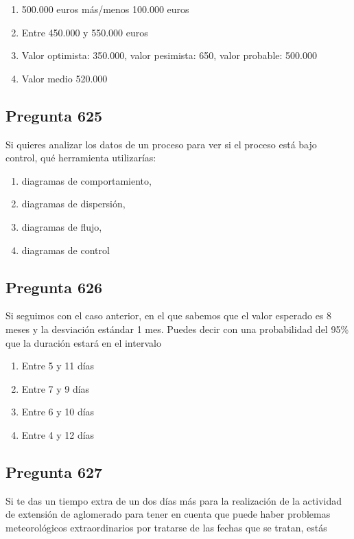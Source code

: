 \documentclass[11pt,a4paper]{article}
\begin{document}
\begin{enumerate}[label=\alph*)]
  \item 500.000 euros más/menos 100.000 euros
  \item Entre 450.000 y 550.000 euros
  \item Valor optimista: 350.000, valor pesimista: 650, valor probable: 500.000
  \item Valor medio 520.000
\end{enumerate}

\subsection*{Pregunta 625}
Si quieres analizar los datos de un proceso para ver si el proceso está bajo control, qué herramienta utilizarías:

\begin{enumerate}[label=\alph*)]
  \item diagramas de comportamiento,
  \item diagramas de dispersión,
  \item diagramas de flujo,
  \item diagramas de control
\end{enumerate}

\subsection*{Pregunta 626}
Si seguimos con el caso anterior, en el que sabemos que el valor esperado es 8 meses y la desviación estándar 1 mes. Puedes decir con una probabilidad del 95\% que la duración estará en el intervalo

\begin{enumerate}[label=\alph*)]
  \item Entre 5 y 11 días
  \item Entre 7 y 9 días
  \item Entre 6 y 10 días
  \item Entre 4 y 12 días
\end{enumerate}

\subsection*{Pregunta 627}
Si te das un tiempo extra de un dos días más para la realización de la actividad de extensión de aglomerado para tener en cuenta que puede haber problemas meteorológicos extraordinarios por tratarse de las fechas que se tratan, estás
\end{document}
